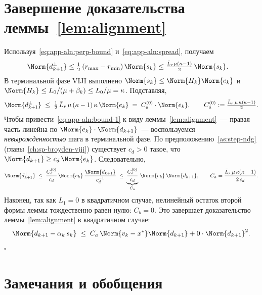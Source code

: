\section{Завершение доказательства леммы~\ref{lem:alignment}}
\label{sec:app-aln:close}

Используя~\eqref{eq:app-aln:perp-bound} и~\eqref{eq:app-aln:spread}, получаем
\begin{align}
\Norm{d_{k+1}^{\perp}}
&\le \tfrac{1}{2}\,(r_{\max} - r_{\min})\,\Norm{s_k}
\le \tfrac{\bar L_r \mu (\kappa - 1)}{2}\,\Norm{s_k}.
\label{eq:app-aln:perp-final}
\end{align}
В терминальной фазе VIJI выполнено
$\Norm{s_k} \le \Norm{H_k}\Norm{e_k}$ и
$\Norm{H_k} \le L_0/(\mu + \beta_k) \le L_0/\mu = \kappa$. Подставляя,
\begin{equation}
\Norm{d_{k+1}^{\perp}}
\;\le\; \tfrac{1}{2}\,\bar L_r\, \mu\, (\kappa - 1)\, \kappa\, \Norm{e_k}
\;=\; C_a^{(0)} \cdot \Norm{e_k},
\qquad
C_a^{(0)} := \tfrac{\bar L_r\, \mu\, \kappa(\kappa - 1)}{2}.
\label{eq:app-aln:bound-1}
\end{equation}
Чтобы привести~\eqref{eq:app-aln:bound-1} к виду леммы~\ref{lem:alignment}~---
правая часть линейна по $\Norm{e_k}\cdot\Norm{d_{k+1}}$~--- воспользуемся
\emph{невырожденностью} шага в терминальной фазе. По
предположению~\ref{as:step-ndg} (главы~\ref{ch:sp-broyden-viji}) существует
$c_d > 0$ такое, что $\Norm{d_{k+1}} \ge c_d\,\Norm{e_k}$. Следовательно,
\begin{equation}
\Norm{d_{k+1}^{\perp}}
\;\le\; \frac{C_a^{(0)}}{c_d}\,\Norm{e_k}\,\frac{\Norm{d_{k+1}}}{c_d^{-1}}
\;\le\; \underbrace{\frac{C_a^{(0)}}{c_d}}_{C_a}\,
        \Norm{e_k}\, \Norm{d_{k+1}},
\qquad
C_a = \frac{\bar L_r\, \mu\, \kappa(\kappa - 1)}{2\, c_d}.
\label{eq:app-aln:Ca}
\end{equation}
Наконец, так как $L_1 = 0$ в квадратичном случае, нелинейный остаток
второй формы леммы тождественно равен нулю: $C_b = 0$. Это завершает
доказательство леммы~\ref{lem:alignment} в квадратичном случае:
\begin{equation}
\Norm{d_{k+1} - \alpha_k\, s_k}
\;\le\; C_a\,\Norm{v_k - x^{*}}\Norm{d_{k+1}} + 0\cdot\Norm{d_{k+1}}^{2}.
\label{eq:app-aln:final}
\end{equation}
$\square$

\section{Замечания и обобщения}
\label{sec:app-aln:general}

